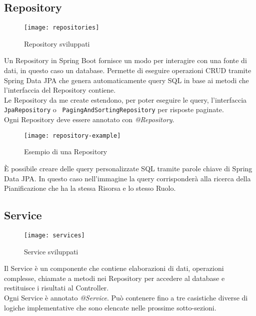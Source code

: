 \subsection{Repository}
\begin{figure}[H] 
    \centering 
    \texttt{[image: repositories]} 
    \caption{Repository sviluppati}
\end{figure}
Un Repository in Spring Boot fornisce un modo per interagire con una fonte di dati, in questo caso un database. Permette di eseguire operazioni CRUD tramite Spring Data JPA che genera automaticamente query SQL in base ai metodi che l'interfaccia del Repository contiene.\\
Le Repository da me create estendono, per poter eseguire le query, l'interfaccia \texttt{JpaRepository} o \texttt{ PagingAndSortingRepository} per risposte paginate.\\
Ogni Repository deve essere annotato con \textit{@Repository}. 
\begin{figure}[H] 
    \centering 
    \texttt{[image: repository-example]} 
    \caption{Esempio di una Repository}
\end{figure}
\noindent È possibile creare delle query personalizzate SQL tramite parole chiave di Spring Data JPA. In questo caso nell'immagine la query corrisponderà alla ricerca della Pianificazione che ha la stessa Risorsa e lo stesso Ruolo.

\subsection{Service}
\begin{figure}[H] 
    \centering 
    \texttt{[image: services]} 
    \caption{Service sviluppati}
\end{figure}
Il Service è un componente che contiene elaborazioni di dati, operazioni complesse, chiamate a metodi nei Repository per accedere al database e restituisce i risultati al Controller.\\
Ogni Service è annotato \textit{@Service}. Può contenere fino a tre casistiche diverse di logiche implementative che sono elencate nelle prossime sotto-sezioni.


